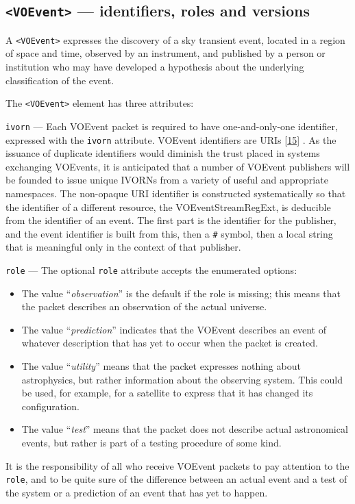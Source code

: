 \documentclass[11pt,a4paper]{ivoa}
\begin{document}
\subsection{{\tt <VOEvent>} --- identifiers, roles and versions}
\label{sec:3.1}
A {\tt <VOEvent>} expresses the discovery of a sky transient event, located in a region of space and time, observed by an instrument, and published by a person or institution who may have developed a hypothesis about the underlying classification of the event. 

The {\tt <VOEvent>} element has three attributes:  

 {\tt ivorn} \label{sec:3.1.1} ---
Each VOEvent packet is required to have one-and-only-one identifier, expressed with the {\tt ivorn} attribute. VOEvent identifiers are URIs 
[\hyperref[bib15]{15}]
. As the issuance of duplicate identifiers would diminish the trust placed in systems exchanging VOEvents, it is anticipated that a number of VOEvent publishers will be founded to issue unique IVORNs from a variety of useful and appropriate namespaces. The non-opaque URI identifier is constructed systematically so that the identifier of a different resource, the VOEventStreamRegExt, is deducible from the identifier of an event. The first part is the identifier for the publisher, and the event identifier is built from this, then a {\tt\#} symbol, then a local string that is meaningful only in the context of that publisher.

 {\tt role} \label{sec:3.1.2} ---
The optional {\tt role} attribute accepts the enumerated options:
\begin{itemize}
\item The value ``\emph{observation}'' is the default if the role is missing; this means that the packet describes an observation of the actual universe. 
\item The value ``\emph{prediction}'' indicates that the VOEvent describes an event of whatever description that has yet to occur when the packet is created. 
\item The value ``\emph{utility}'' means that the packet expresses nothing about astrophysics, but rather information about the observing system. This could be used, for example, for a satellite to express that it has changed its configuration. 
\item The value ``\emph{test}'' means that the packet does not describe actual astronomical events, but rather is part of a testing procedure of some kind.
\end{itemize}
It is the responsibility of all who receive VOEvent packets to pay attention to the {\tt role}, and to be quite sure of the difference between an actual event and a test of the system or a prediction of an event that has yet to happen. 
\end{document}
